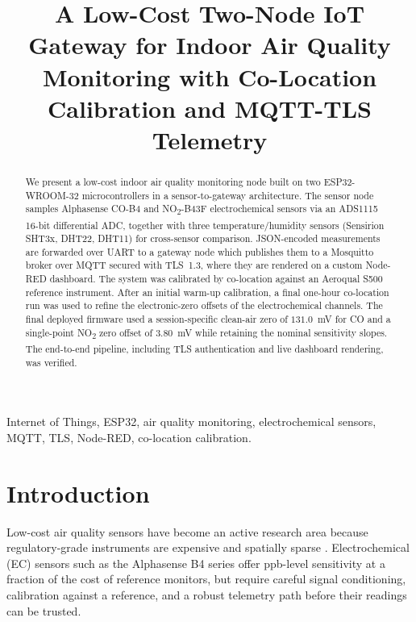 \documentclass[conference]{IEEEtran}
\begin{document}
\title{A Low-Cost Two-Node IoT Gateway for Indoor Air Quality Monitoring with Co-Location Calibration and MQTT-TLS Telemetry}

\author{
}

\maketitle

\begin{abstract}
We present a low-cost indoor air quality monitoring node built on two ESP32-WROOM-32 microcontrollers in a sensor-to-gateway architecture. The sensor node samples Alphasense CO-B4 and NO\textsubscript{2}-B43F electrochemical sensors via an ADS1115 16-bit differential ADC, together with three temperature/humidity sensors (Sensirion SHT3x, DHT22, DHT11) for cross-sensor comparison. JSON-encoded measurements are forwarded over UART to a gateway node which publishes them to a Mosquitto broker over MQTT secured with TLS~1.3, where they are rendered on a custom Node-RED dashboard. The system was calibrated by co-location against an Aeroqual S500 reference instrument. After an initial warm-up calibration, a final one-hour co-location run was used to refine the electronic-zero offsets of the electrochemical channels. The final deployed firmware used a session-specific clean-air zero of $131.0$~mV for CO and a single-point NO\textsubscript{2} zero offset of $3.80$~mV while retaining the nominal sensitivity slopes. The end-to-end pipeline, including TLS authentication and live dashboard rendering, was verified.
\end{abstract}

\begin{IEEEkeywords}
Internet of Things, ESP32, air quality monitoring, electrochemical sensors, MQTT, TLS, Node-RED, co-location calibration.
\end{IEEEkeywords}

\section{Introduction}
Low-cost air quality sensors have become an active research area because regulatory-grade instruments are expensive and spatially sparse \cite{castell2017,mead2013}. Electrochemical (EC) sensors such as the Alphasense B4 series offer ppb-level sensitivity at a fraction of the cost of reference monitors, but require careful signal conditioning, calibration against a reference, and a robust telemetry path before their readings can be trusted.
\end{document}
